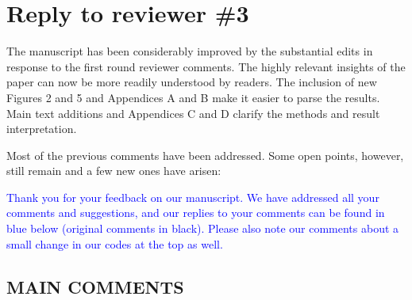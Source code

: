 \documentclass[
]{article}
\begin{document}
\section{Reply to reviewer \#3}

The manuscript has been considerably improved by the substantial edits in response to the first round reviewer comments. The highly relevant insights of the paper can now be more readily understood by readers. The inclusion of new Figures 2 and 5 and Appendices A and B make it easier to parse the results. Main text additions and Appendices C and D clarify the methods and result interpretation.

Most of the previous comments have been addressed. Some open points, however, still remain and a few new ones have arisen:

\textcolor{blue}{Thank you for your feedback on our manuscript. We have addressed all your comments and suggestions, and our replies to your comments can be found in blue below (original comments in black). Please also note our comments about a small change in our codes at the top as well.}

\subsection{MAIN COMMENTS}
\end{document}
